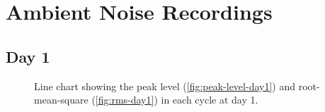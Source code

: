 \chapter{Ambient Noise Recordings}
\label{ch:appendix-ambient-noise}

\section{Day 1} %
\label{sec:ambient-noise-day_1}
\begin{figure}[H]
	\centering
	\caption{Line chart showing the peak level (\ref{fig:peak-level-day1}) and root-mean-square (\ref{fig:rms-day1}) in each cycle at day 1.}
	\label{fig:audio-result-day1}
\end{figure}

